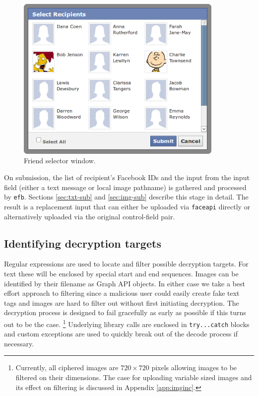     \begin{figure}[tb]
        \begin{center}
                \includegraphics[width=10cm]{screens/fselector.png}
            \caption{Friend selector window.}
            \label{scn:fselector}
        \end{center}
    \end{figure}

On submission, the list of recipient's Facebook IDs and the input from the input field (either a text message or local image pathname) is gathered and processed by {\tt efb}. Sections \ref{sec:txt-sub} and \ref{sec:img-sub} describe this stage in detail. The result is a replacement input that can either be uploaded via {\tt faceapi} directly or alternatively uploaded via the original control-field pair.

\subsection{Identifying decryption targets}
\label{ssec:ident-targets}

Regular expressions are used to locate and filter possible decryption targets. For text these will be enclosed by special start and end sequences. Images can be identified by their filename as Graph API objects. In either case we take a best effort approach to filtering since a malicious user could easily create fake text tags and images are hard to filter out without first initiating decryption. The decryption process is designed to fail gracefully as early as possible if this turns out to be the case. \footnote{Currently, all ciphered images are $720 \times 720$ pixels allowing images to be filtered on their dimensions. The case for uploading variable sized images and its effect on filtering is discussed in Appendix \ref{app:imginc}.} Underlying library calls are enclosed in {\tt try...catch} blocks and custom exceptions are used to quickly break out of the decode process if necessary.

